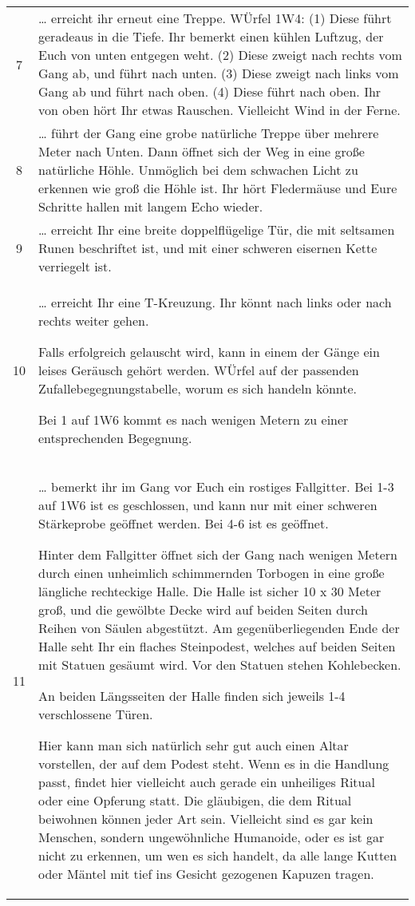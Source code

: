 \documentclass[11pt]{wbzine}
\begin{document}
\begin{tabularx}{\columnwidth}{cZ}
7 & 
  \ldots{} erreicht ihr erneut eine Treppe. WÜrfel 1W4: (1) Diese führt
  geradeaus in die Tiefe. Ihr bemerkt einen kühlen Luftzug, der Euch von
  unten entgegen weht. (2) Diese zweigt nach rechts vom Gang ab, und
  führt nach unten. (3) Diese zweigt nach links vom Gang ab und führt
  nach oben. (4) Diese führt nach oben. Ihr von oben hört Ihr etwas
  Rauschen. Vielleicht Wind in der Ferne.
\\
8 & 
  \ldots{} führt der Gang eine grobe natürliche Treppe über mehrere
  Meter nach Unten. Dann öffnet sich der Weg in eine große natürliche
  Höhle. Unmöglich bei dem schwachen Licht zu erkennen wie groß die
  Höhle ist. Ihr hört Fledermäuse und Eure Schritte hallen mit langem
  Echo wieder.
\\
9 & 
  \ldots{} erreicht Ihr eine breite doppelflügelige Tür, die mit
  seltsamen Runen beschriftet ist, und mit einer schweren eisernen Kette
  verriegelt ist.
\\
10 & 
  \ldots{} erreicht Ihr eine T-Kreuzung. Ihr könnt nach links oder nach
  rechts weiter gehen.

  Falls erfolgreich gelauscht wird, kann in einem der Gänge ein leises
  Geräusch gehört werden. WÜrfel auf der passenden
  Zufallebegegnungstabelle, worum es sich handeln könnte.

  Bei 1 auf 1W6 kommt es nach wenigen Metern zu einer entsprechenden
  Begegnung.
\\
11 & 
  \ldots{} bemerkt ihr im Gang vor Euch ein rostiges Fallgitter. Bei 1-3
  auf 1W6 ist es geschlossen, und kann nur mit einer schweren
  Stärkeprobe geöffnet werden. Bei 4-6 ist es geöffnet.

  Hinter dem Fallgitter öffnet sich der Gang nach wenigen Metern durch
  einen unheimlich schimmernden Torbogen in eine große längliche
  rechteckige Halle. Die Halle ist sicher 10 x 30 Meter groß, und die
  gewölbte Decke wird auf beiden Seiten durch Reihen von Säulen
  abgestützt. Am gegenüberliegenden Ende der Halle seht Ihr ein flaches
  Steinpodest, welches auf beiden Seiten mit Statuen gesäumt wird. Vor
  den Statuen stehen Kohlebecken.

  An beiden Längsseiten der Halle finden sich jeweils 1-4 verschlossene
  Türen.

  Hier kann man sich natürlich sehr gut auch einen Altar vorstellen, der
  auf dem Podest steht. Wenn es in die Handlung passt, findet hier
  vielleicht auch gerade ein unheiliges Ritual oder eine Opferung statt.
  Die gläubigen, die dem Ritual beiwohnen können jeder Art sein.
  Vielleicht sind es gar kein Menschen, sondern ungewöhnliche Humanoide,
  oder es ist gar nicht zu erkennen, um wen es sich handelt, da alle
  lange Kutten oder Mäntel mit tief ins Gesicht gezogenen Kapuzen
  tragen.
\\
\end{tabularx}
\end{document}
